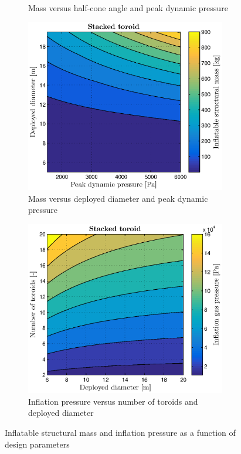 \begin{figure}[ht]
\begin{subfigure}[b]{0.49\textwidth}
		\caption{Mass versus half-cone angle and peak dynamic pressure}
		\label{fig:halfcone_strucmass}
	\end{subfigure}
	\begin{subfigure}[b]{0.49\textwidth}
		\includegraphics[width=0.96\textwidth]{./Figure/Structure/pressure_test.eps}
		\caption{Mass versus deployed diameter and peak dynamic pressure}
		\label{fig:press_strucmass}
	\end{subfigure}
	\begin{subfigure}[b]{0.49\textwidth}
		\includegraphics[width=0.96\textwidth]{./Figure/Structure/inflation_test.eps}
		\caption{Inflation pressure versus number of toroids and deployed diameter}
		\label{fig:inflpress_strucmass}
	\end{subfigure}
\caption{Inflatable structural mass and inflation pressure as a function of design parameters}
\end{figure}
